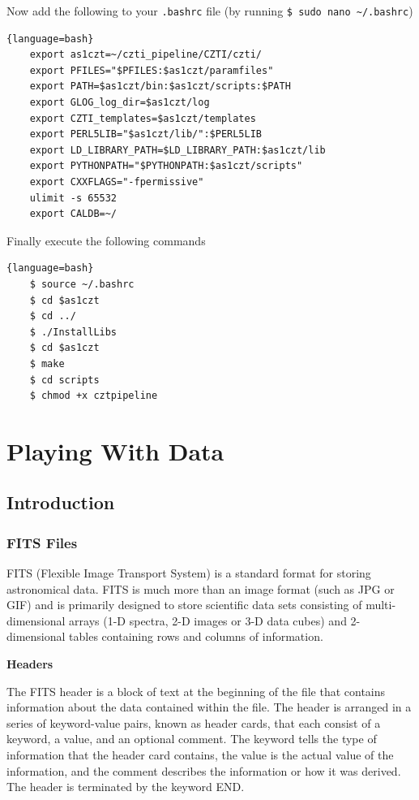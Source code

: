 \documentclass[11pt]{book} %
\begin{document}
Now add the following to your \lstinline[language=bash]{.bashrc} file (by running \lstinline[language=bash]{$ sudo nano ~/.bashrc})
\begin{lstlisting}{language=bash}
    export as1czt=~/czti_pipeline/CZTI/czti/
    export PFILES="$PFILES:$as1czt/paramfiles"
    export PATH=$as1czt/bin:$as1czt/scripts:$PATH
    export GLOG_log_dir=$as1czt/log
    export CZTI_templates=$as1czt/templates
    export PERL5LIB="$as1czt/lib/":$PERL5LIB
    export LD_LIBRARY_PATH=$LD_LIBRARY_PATH:$as1czt/lib
    export PYTHONPATH="$PYTHONPATH:$as1czt/scripts"
    export CXXFLAGS="-fpermissive"
    ulimit -s 65532
    export CALDB=~/
\end{lstlisting}


Finally execute the following commands

\begin{lstlisting}{language=bash}
    $ source ~/.bashrc
    $ cd $as1czt
    $ cd ../
    $ ./InstallLibs
    $ cd $as1czt
    $ make
    $ cd scripts
    $ chmod +x cztpipeline
\end{lstlisting}



\chapter{Playing With Data}

\section{Introduction}

\subsection{FITS Files}

FITS (Flexible Image Transport System) is a standard format for storing astronomical data. FITS is much more than an image format (such as JPG or GIF) and is primarily designed to store scientific data sets consisting of multi-dimensional arrays (1-D spectra, 2-D images or 3-D data cubes) and 2-dimensional tables containing rows and columns of information.

\noindent\textbf{Headers}

The FITS header is a block of text at the beginning of the file that contains information about the data contained within the file. The header is arranged in a series of keyword-value pairs, known as header cards, that each consist of a keyword, a value, and an optional comment. The keyword tells the type of information that the header card contains, the value is the actual value of the information, and the comment describes the information or how it was derived. The header is terminated by the keyword END.
\end{document}
